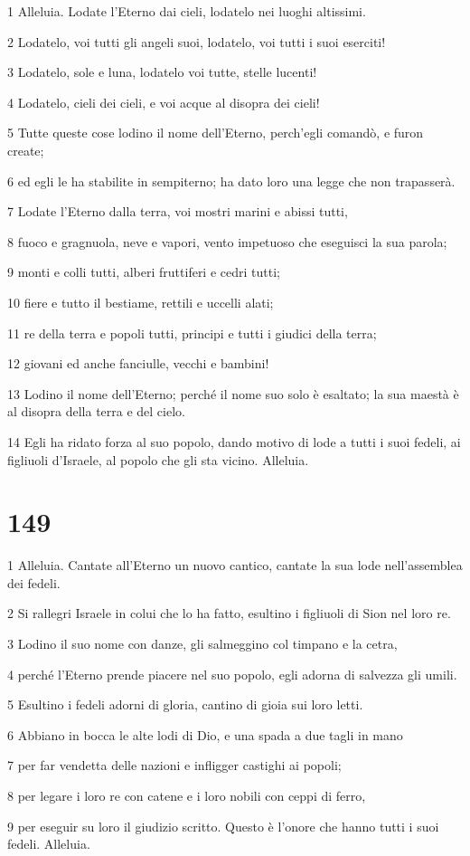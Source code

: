 \par 1 Alleluia. Lodate l'Eterno dai cieli, lodatelo nei luoghi altissimi.
\par 2 Lodatelo, voi tutti gli angeli suoi, lodatelo, voi tutti i suoi eserciti!
\par 3 Lodatelo, sole e luna, lodatelo voi tutte, stelle lucenti!
\par 4 Lodatelo, cieli dei cieli, e voi acque al disopra dei cieli!
\par 5 Tutte queste cose lodino il nome dell'Eterno, perch'egli comandò, e furon create;
\par 6 ed egli le ha stabilite in sempiterno; ha dato loro una legge che non trapasserà.
\par 7 Lodate l'Eterno dalla terra, voi mostri marini e abissi tutti,
\par 8 fuoco e gragnuola, neve e vapori, vento impetuoso che eseguisci la sua parola;
\par 9 monti e colli tutti, alberi fruttiferi e cedri tutti;
\par 10 fiere e tutto il bestiame, rettili e uccelli alati;
\par 11 re della terra e popoli tutti, principi e tutti i giudici della terra;
\par 12 giovani ed anche fanciulle, vecchi e bambini!
\par 13 Lodino il nome dell'Eterno; perché il nome suo solo è esaltato; la sua maestà è al disopra della terra e del cielo.
\par 14 Egli ha ridato forza al suo popolo, dando motivo di lode a tutti i suoi fedeli, ai figliuoli d'Israele, al popolo che gli sta vicino. Alleluia.

\chapter{149}

\par 1 Alleluia. Cantate all'Eterno un nuovo cantico, cantate la sua lode nell'assemblea dei fedeli.
\par 2 Si rallegri Israele in colui che lo ha fatto, esultino i figliuoli di Sion nel loro re.
\par 3 Lodino il suo nome con danze, gli salmeggino col timpano e la cetra,
\par 4 perché l'Eterno prende piacere nel suo popolo, egli adorna di salvezza gli umili.
\par 5 Esultino i fedeli adorni di gloria, cantino di gioia sui loro letti.
\par 6 Abbiano in bocca le alte lodi di Dio, e una spada a due tagli in mano
\par 7 per far vendetta delle nazioni e infligger castighi ai popoli;
\par 8 per legare i loro re con catene e i loro nobili con ceppi di ferro,
\par 9 per eseguir su loro il giudizio scritto. Questo è l'onore che hanno tutti i suoi fedeli. Alleluia.

